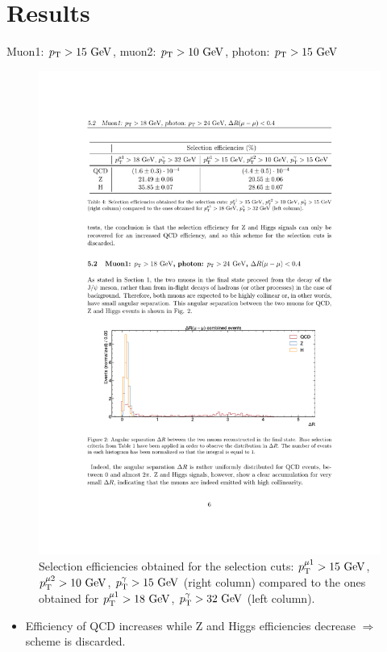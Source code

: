 \documentclass[aspectratio = 1610, xcolor = dvipsnames]{beamer}
\newcommand{\GeV}{\textrm{ }\mathrm{GeV}}
\newcommand{\pt}{p_{\rm T}}
\newcommand{\red}{\textcolor{unipd}}
\begin{document}
	
    \section{Results}
    
    \begin{frame}[t]{Muon1: $\pt > 15\GeV$, muon2: $\pt > 10\GeV$, photon: $\pt>15\GeV$}

        \vspace{0.2cm}

        \begin{figure}[c]
            \centering
            \includegraphics[width=1\textwidth]{images/Mu15_Mu10_Ph15_table.pdf}
            \caption{Selection efficiencies obtained for the selection cuts: $\pt^{\mu 1} > 15\GeV$, $\pt^{\mu 2} > 10\GeV$, $\pt^{\gamma} > 15\GeV$ (right column) compared to the ones obtained for $\pt^{\mu 1} > 18\GeV$, $\pt^{\gamma} > 32\GeV$ (left column). \label{im:Mu15_Mu10_Ph15_table}}
        \end{figure}
        
        \begin{itemize}
            \item Efficiency of QCD \red{increases} while Z and Higgs efficiencies \red{decrease} $\Rightarrow$ scheme is \red{discarded}.
        \end{itemize}

    \end{frame}
\end{document}

